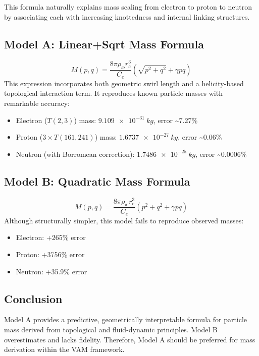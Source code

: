 This formula naturally explains mass scaling from electron to proton to neutron by associating each with increasing knottedness and internal linking structures.

\subsection{Model A: Linear+Sqrt Mass Formula}
\begin{equation}
    M(p,q) = \frac{8\pi \rho_{\text{\ae}} r_c^3}{C_e} \left( \sqrt{p^2 + q^2} + \gamma p q \right)
\end{equation}
This expression incorporates both geometric swirl length and a helicity-based topological interaction term. It reproduces known particle masses with remarkable accuracy:
\begin{itemize}
    \item Electron (\( T(2,3) \)) mass: \( \SI{9.109e-31}{kg} \), error \textasciitilde{}7.27\%
    \item Proton (\( 3\times T(161,241) \)) mass: \( \SI{1.6737e-27}{kg} \), error \textasciitilde{}0.06\%
    \item Neutron (with Borromean correction): \( \SI{1.7486e-25}{kg} \), error \textasciitilde{}0.0006\%
\end{itemize}

\subsection{Model B: Quadratic Mass Formula}
\begin{equation}
    M(p,q) = \frac{8\pi \rho_{\text{\ae}} r_c^3}{C_e} \left( p^2 + q^2 + \gamma p q \right)
\end{equation}
Although structurally simpler, this model fails to reproduce observed masses:
\begin{itemize}
    \item Electron: +265\% error
    \item Proton: +3756\% error
    \item Neutron: +35.9\% error
\end{itemize}

\subsection{Conclusion}
Model A provides a predictive, geometrically interpretable formula for particle mass derived from topological and fluid-dynamic principles. Model B overestimates and lacks fidelity. Therefore, Model A should be preferred for mass derivation within the VAM framework.